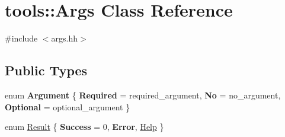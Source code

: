 \hypertarget{classtools_1_1Args}{\section{tools\-:\-:Args Class Reference}
\label{classtools_1_1Args}
}


{\ttfamily \#include $<$args.\-hh$>$}

\subsection*{Public Types}
\begin{DoxyCompactItemize}
\item 
enum {\bfseries Argument} \{ {\bfseries Required} = required\-\_\-argument, 
{\bfseries No} = no\-\_\-argument, 
{\bfseries Optional} = optional\-\_\-argument
 \}
\item 
enum \hyperlink{classtools_1_1Args_ae0b38617134893616df504e543ba6e6e}{Result} \{ {\bfseries Success} = 0, 
{\bfseries Error}, 
\hyperlink{classtools_1_1Args_ae0b38617134893616df504e543ba6e6ea3be887fb99c1931485e91a4e0bdcf539}{Help}
 \}
\end{DoxyCompactItemize}
